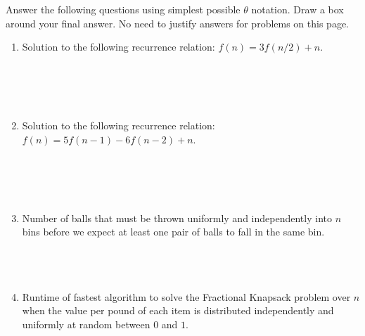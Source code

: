 \documentclass[11pt]{article}
\newcommand{\ans}[1]{}
\begin{document}
\begin{enumerate}
 

 
 Answer the following questions using simplest possible $\theta$ notation.  Draw a box around your final answer.  No need to justify answers for problems on this page.
 
 \begin{enumerate}

\item Solution to the following recurrence relation: $f(n) = 3f(n/2) + n$. \ans{$\theta(n^{\log_{2} 3})$} \\ \ \\ \ \\ \ \\ \ \\

\item Solution to the following recurrence relation: $f(n) = 5f(n-1) - 6f(n-2) + n$. \ans{$\theta(3^{n})$ or $\theta(c_{1}2^{n} + c_{2}3^{n} + c_{3}n + c_{4})$.  Annihilator is $(L - 2)(L-3)(L-1)^{2}$.} \\ \ \\ \ \\ \ \\ \ \\



\item Number of balls that must be thrown uniformly and independently into $n$ bins before we expect at least one pair of balls to fall in the same bin. \ans{$\theta(\sqrt{n})$.  This is what we showed in the birthday paradox analysis.} \\ \ \\ \ \\ \ \\

\item Runtime of fastest algorithm to solve the Fractional Knapsack problem over $n$ when the value per pound of each item is distributed independently and uniformly at random between $0$ and $1$. \ans{$\Theta(n)$ since can use bucket sort to do the sorting.} 


\end{enumerate}
\end{enumerate}
\end{document}
